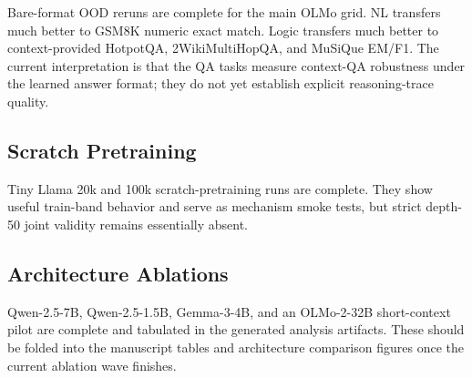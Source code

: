Bare-format OOD reruns are complete for the main OLMo grid. NL transfers much
better to GSM8K numeric exact match. Logic transfers much better to
context-provided HotpotQA, 2WikiMultiHopQA, and MuSiQue EM/F1. The current
interpretation is that the QA tasks measure context-QA robustness under the
learned answer format; they do not yet establish explicit reasoning-trace
quality.

\subsection{Scratch Pretraining}

Tiny Llama 20k and 100k scratch-pretraining runs are complete. They show useful
train-band behavior and serve as mechanism smoke tests, but strict depth-50
joint validity remains essentially absent.

\subsection{Architecture Ablations}

Qwen-2.5-7B, Qwen-2.5-1.5B, Gemma-3-4B, and an OLMo-2-32B short-context pilot
are complete and tabulated in the generated analysis artifacts. These should be
folded into the manuscript tables and architecture comparison figures once the
current ablation wave finishes.
